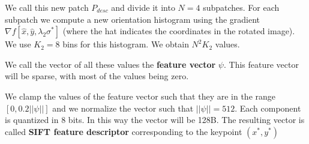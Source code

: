 We call this new patch $P_{desc}$ and divide it into $N=4$ subpatches. For each subpatch we
compute a new orientation histogram using the gradient $\nabla f[\hat{x},\hat{y},\lambda_2\sigma^*]$ (where
the hat indicates the coordinates in the rotated image).
We use $K_2=8$ bins for this histogram. We obtain $N^2K_2$ values.

We call the vector of all these values the \textbf{feature vector} $\psi$.
This feature vector will be sparse, with most of the values being zero.

We clamp the values of the feature vector such that they are in the range $[0,0.2||\psi||]$
and we normalize the vector such that $||\psi||=512$.
Each component is quantized in 8 bits.
In this way the vector will be 128B.
The resulting vector is called \textbf{SIFT feature descriptor} corresponding to the keypoint
$(x^*,y^*)$